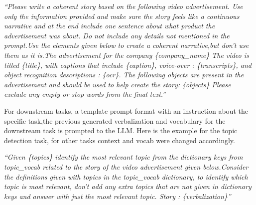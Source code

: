 \textit{``Please write a coherent story based on the following video advertisement. Use only the information provided and make sure the story feels like a continuous narrative and at the end include one sentence about what product the advertisement was about. Do not include any details not mentioned in the prompt.Use the elements given below to create a coherent narrative,but don't use them as it is.The advertisement for the company \{company\_name\} The video is titled \{title\}, with captions that include \{caption\}, voice-over : \{transcripts\}, and object recognition descriptions : \{ocr\}. The following objects are present in the advertisement and should be used to help create the story: \{objects\} Please exclude any empty or stop words from the final text.''}

For downstream tasks, a template prompt format with an instruction about the specific task,the previous generated verbalization and vocabulary for the downstream task is prompted to the LLM. Here is the example for the topic detection task, for other tasks context and vocab were changed accordingly.

\textit{``Given \{topics\} identify the most relevant topic from the dictionary keys from topic\_vocab related to the story of the video advertisement given below.Consider the definitions given with topics in the topic\_vocab dictionary, to identify which topic is most relevant, don't add any extra topics that are not given in dictionary keys and answer with just the most relevant topic. Story : \{verbalization\}''}


